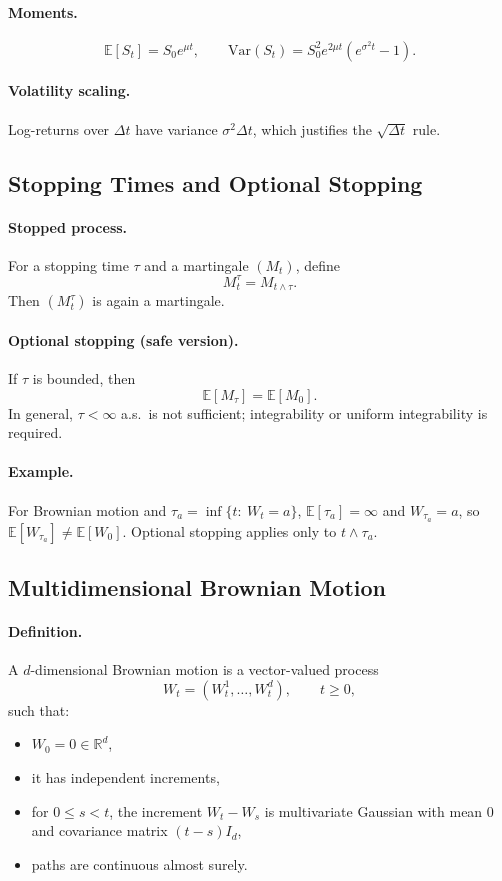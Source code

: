 \documentclass[11pt]{article}
\newcommand{\R}{\mathbb{R}}
\newcommand{\E}{\mathbb{E}}
\newcommand{\Var}{\mathrm{Var}}
\newcommand{\1}{\mathbf{1}}
\theoremstyle{plain}
\theoremstyle{definition}
\theoremstyle{remark}
\begin{document}
\paragraph{Moments.}
\[
\E[S_t]=S_0 e^{\mu t},
\qquad
\Var(S_t)=S_0^2 e^{2\mu t}(e^{\sigma^2 t}-1).
\]

\paragraph{Volatility scaling.}
Log-returns over $\Delta t$ have variance $\sigma^2\Delta t$,
which justifies the $\sqrt{\Delta t}$ rule.

\subsection{Stopping Times and Optional Stopping}

\paragraph{Stopped process.}
For a stopping time $\tau$ and a martingale $(M_t)$, define
\[
M_t^\tau=M_{t\wedge\tau}.
\]
Then $(M_t^\tau)$ is again a martingale.

\paragraph{Optional stopping (safe version).}
If $\tau$ is bounded, then
\[
\E[M_\tau]=\E[M_0].
\]
In general, $\tau<\infty$ a.s.\ is not sufficient;
integrability or uniform integrability is required.

\paragraph{Example.}
For Brownian motion and $\tau_a=\inf\{t:\ W_t=a\}$,
$\E[\tau_a]=\infty$ and $W_{\tau_a}=a$,
so $\E[W_{\tau_a}]\neq\E[W_0]$.
Optional stopping applies only to $t\wedge\tau_a$.

\medskip
\subsection{Multidimensional Brownian Motion}

\paragraph{Definition.}
A $d$-dimensional Brownian motion is a vector-valued process
\[
W_t=(W_t^1,\dots,W_t^d),\qquad t\ge 0,
\]
such that:
\begin{itemize}
  \item $W_0=0\in\R^d$,
  \item it has independent increments,
  \item for $0\le s<t$, the increment $W_t-W_s$ is multivariate Gaussian
  with mean $0$ and covariance matrix $(t-s)I_d$,
  \item paths are continuous almost surely.
\end{itemize}
\end{document}
